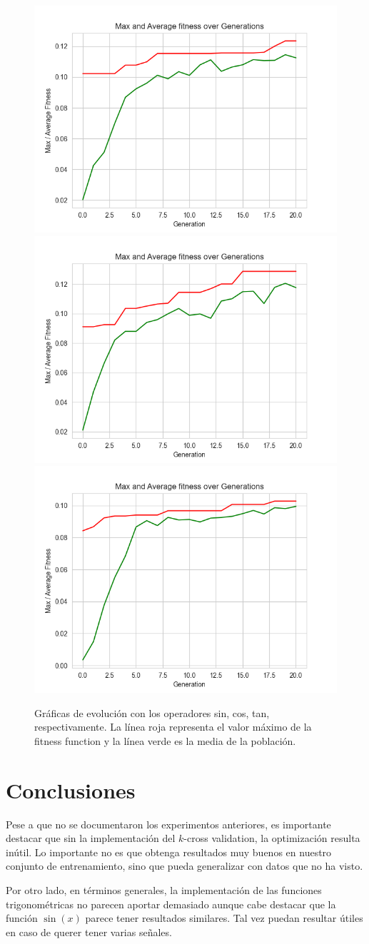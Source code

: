 \documentclass[11pt]{article}
\begin{document}
\begin{figure}[H]
    \centering
    \includegraphics[width=.45\textwidth]{../src/imgs/genetic_sin.png}
    \includegraphics[width=.45\textwidth]{../src/imgs/genetic_cos.png}
    \includegraphics[width=.45\textwidth]{../src/imgs/genetic_tan.png}
    \caption{Gráficas de evolución con los operadores sin, cos, tan, respectivamente. La línea roja representa el valor máximo de la fitness function y la línea verde es la media de la población.}
\end{figure}


\section{Conclusiones}
Pese a que no se documentaron los experimentos anteriores, es importante destacar que sin la implementación del $k$-cross validation, la optimización resulta inútil. Lo importante no es que obtenga resultados muy buenos en nuestro conjunto de entrenamiento, sino que pueda generalizar con datos que no ha visto.

Por otro lado, en términos generales, la implementación de las funciones trigonométricas no parecen aportar demasiado aunque cabe destacar que la función $\sin(x)$ parece tener resultados similares. Tal vez puedan resultar útiles en caso de querer tener varias señales.
\end{document}
